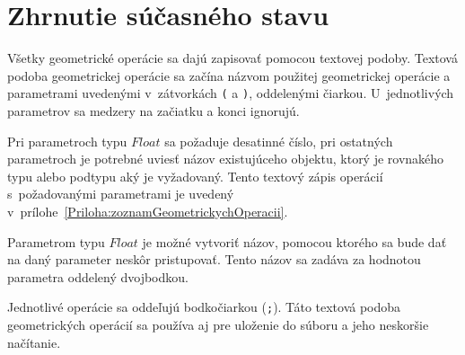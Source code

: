 \chapter{Zhrnutie súčasného stavu}
Všetky geometrické operácie sa dajú zapisovať pomocou textovej podoby. 
Textová podoba geometrickej operácie sa začína názvom použitej geometrickej operácie a parametrami uvedenými v~zátvorkách \texttt{(} a \texttt{)}, oddelenými čiarkou. U~jednotlivých parametrov sa medzery na začiatku a konci ignorujú.

Pri parametroch typu $Float$ sa požaduje desatinné číslo, pri ostatných parametroch je potrebné uviesť názov existujúceho objektu, ktorý je rovnakého typu alebo podtypu aký je vyžadovaný. Tento textový zápis operácií s~požadovanými parametrami je uvedený v~prílohe~\ref{Priloha:zoznamGeometrickychOperacii}.

Parametrom typu $Float$ je možné vytvoriť názov, pomocou ktorého sa bude dať na daný parameter neskôr pristupovať. 
Tento názov sa zadáva za hodnotou parametra oddelený dvojbodkou.

Jednotlivé operácie sa oddeľujú bodkočiarkou (\texttt{;}). 
Táto textová podoba geometrických operácií sa používa aj pre uloženie do súboru a jeho neskoršie načítanie. 


